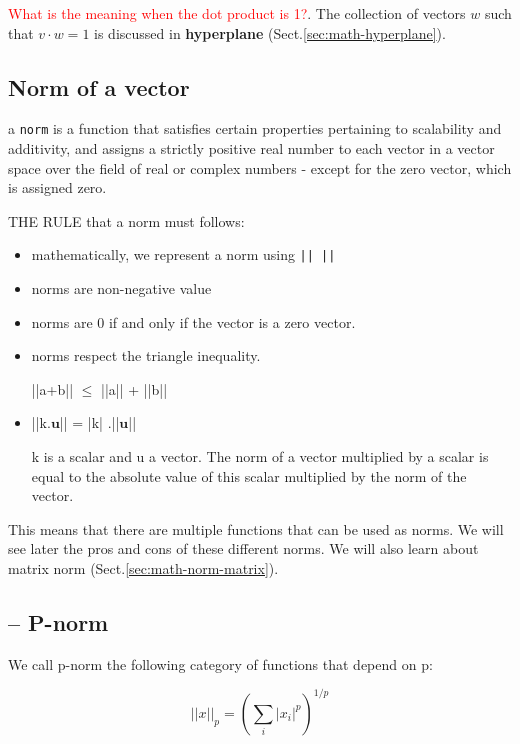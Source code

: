 \textcolor{red}{What is the meaning when the dot product is 1?}. The collection
of vectors $w$ such that $v \cdot w = 1$ is discussed in {\bf hyperplane}
(Sect.\ref{sec:math-hyperplane}).

\subsection{Norm of a vector}
\label{sec:math-norm-vector}

a \verb!norm! is a function that satisfies certain properties pertaining to
scalability and additivity, and assigns a strictly positive real number to each
vector in a vector space over the field of real or complex numbers - except for
the zero vector, which is assigned zero.

THE RULE that a norm must follows:
\begin{itemize} 
  
  \item mathematically, we represent a norm using \verb!|| ||! 
  \item  norms are non-negative value
  
  \item norms are 0 if and only if the vector is a zero vector.
  
  \item norms respect the triangle inequality. 
  
  ||a+b|| $\le$ ||a|| + ||b||
  
  \item ||k.$\mathbf{u}$|| = |k| .||$\mathbf{u}$||
  
   k is a scalar and u a vector.
   The norm of a vector multiplied by a scalar is equal to the absolute value of
   this scalar multiplied by the norm of the vector.
   
\end{itemize}

This means that there are multiple functions that can be used as norms. We will
see later the pros and cons of these different norms. We will also learn about matrix norm (Sect.\ref{sec:math-norm-matrix}).

\subsection{-- P-norm}

We call p-norm the following category of functions that depend on p:

\begin{equation}
||x||_p = \left( \sum_i |x_i|^p  \right)^{1/p}
\end{equation}

